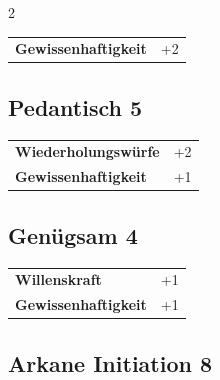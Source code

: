 \begin{multicols}{2}
\begin{tcolorbox}
\begin{tabular}{@{}ll@{}}
    \textbf{Gewissenhaftigkeit} & +2\\
\end{tabular}


\end{tcolorbox}

\begin{tcolorbox}
    \subsection*{Pedantisch \hfill \small{5 }}
    \tcblower




\begin{tabular}{@{}ll@{}}
    \textbf{Wiederholungswürfe} & +2\\
    \textbf{Gewissenhaftigkeit} & +1\\
\end{tabular}


\end{tcolorbox}

\begin{tcolorbox}
    \subsection*{Genügsam \hfill \small{4 }}
    \tcblower




\begin{tabular}{@{}ll@{}}
    \textbf{Willenskraft} & +1\\
    \textbf{Gewissenhaftigkeit} & +1\\
\end{tabular}


\end{tcolorbox}

\begin{tcolorbox}
    \subsection*{Arkane Initiation \hfill \small{8 }}
    \tcblower





\end{tcolorbox}
\end{multicols}
